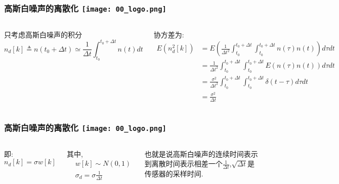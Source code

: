 \begin{frame}
  \frametitle{高斯白噪声的离散化 \hfill \texttt{[image: 00\_logo.png]}}
  \begin{columns}
    

    只考虑高斯白噪声的积分
    \begin{equation}
      n_d[k] \triangleq n(t_0 + \Delta t) \simeq \frac{1}{\Delta t} \int ^{t_0+\Delta t}_{t_0} n(t) dt
    \end{equation}

    协方差为:
    \begin{equation}
      \begin{split}
        E(n^2_d[k]) &= E(\frac{1}{\Delta t^2} \int ^{t_0+\Delta t}_{t_0} \int ^{t_0+\Delta t}_{t_0} n(\tau) n(t))d\tau dt \\
        &= \frac{1}{\Delta t^2} \int ^{t_0+\Delta t}_{t_0} \int ^{t_0+\Delta t}_{t_0} E(n(\tau) n(t))d\tau dt \\
        &= \frac{\sigma^2}{\Delta t^2} \int ^{t_0+\Delta t}_{t_0} \int ^{t_0+\Delta t}_{t_0} \delta(t-\tau)d\tau dt \\
        &= \frac{\sigma^2}{\Delta t}        
      \end{split}
    \end{equation}
    
  
  \end{columns}
  \end{frame}   


\begin{frame}
  \frametitle{高斯白噪声的离散化 \hfill \texttt{[image: 00\_logo.png]}}
  \begin{columns}
    

    即:
    \begin{equation}
      n_d[k] = \sigma w[k]
    \end{equation}

    其中,
    \begin{equation}
      \begin{split}
        &w[k] \sim N(0, 1) \\
        &\sigma_d = \sigma \frac{1}{\Delta t}
      \end{split}
    \end{equation}
    
    也就是说高斯白噪声的连续时间表示到离散时间表示相差一个$\frac{1}{\Delta t}$,$\sqrt{\Delta t}$是传感器的采样时间.

  
  \end{columns}
  \end{frame}   

